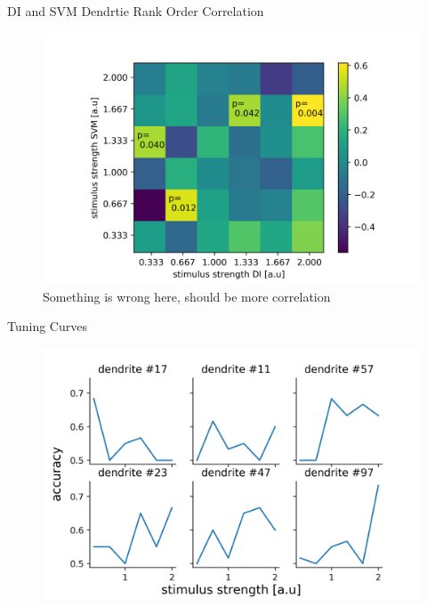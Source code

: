 \documentclass[10pt]{beamer}
\begin{document}
\begin{frame}[fragile]{DI and SVM Dendrtie Rank Order Correlation}
\begin{center}
	\begin{figure}
	\caption*{Something is wrong here, should be more correlation}
      \includegraphics[width=1.0\textwidth]{DI_vs_SVM.png}
	\end{figure}
	\end{center}
\end{frame}

\begin{frame}[fragile]{Tuning Curves}
\begin{center}
	\begin{figure}
      \includegraphics[width=1.0\textwidth]{tuning.png}
	\end{figure}
	\end{center}
\end{frame}
\end{document}
